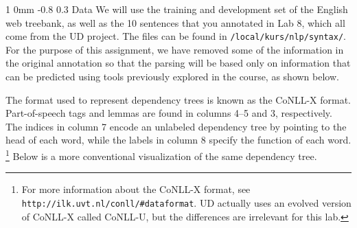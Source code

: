 \documentclass[10.9pt]{article}
\makeatletter
\newcommand{\newsec}[2]{\section{#1}\label{sec:#2}\noindent}
\renewcommand{\section}{\@startsection
{section}%
{1}%
{0mm}%
{-0.8\baselineskip}%
{0.3\baselineskip}%
{\bfseries\large}}%
\makeatother
\begin{document}
\newsec{Data}{data}%
We will use the training and development set of the English web treebank, as well as the 10 sentences that you annotated in Lab 8, which all come from the UD project. The files can be found in {\tt /local/kurs/nlp/syntax/}.
For the purpose of this assignment, we have removed some of the information in the original annotation 
so that the parsing will be based only on information that can be predicted using tools previously explored 
in the course, as shown below.
\begin{center}
\fbox{

}
\end{center}
The format used to represent dependency trees is known as the CoNLL-X format. Part-of-speech tags and lemmas are found in columns 4--5 and 3, respectively. The indices in column 7 encode an unlabeled dependency tree by pointing to the head of each word, while the labels in column 8 specify the function of each word.%
\footnote{For more information about the CoNLL-X format, see 
{\tt http://ilk.uvt.nl/conll/\#dataformat}. UD actually 
uses an evolved version of CoNLL-X called CoNLL-U, but the differences are irrelevant for this lab.} Below is a more conventional visualization of the same dependency tree.
\begin{center}
\end{center}
\end{document}
